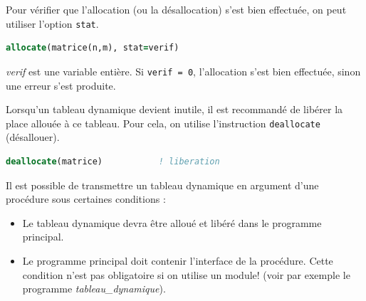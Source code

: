 \documentclass[a4paper,twoside]{article}
\begin{document}
\begin{remarque}
Pour vérifier que l'allocation (ou la désallocation) s'est bien effectuée, on peut utiliser l'option \texttt{stat}. 
\begin{lstlisting}[language=Fortran]
allocate(matrice(n,m), stat=verif)
\end{lstlisting}
\emph{verif} est une variable entière. Si \texttt{verif = 0}, l'allocation s'est bien effectuée, sinon une erreur s'est produite. 
\end{remarque}

Lorsqu'un tableau dynamique devient inutile, il est recommandé de libérer la place allouée à ce tableau. Pour cela, on utilise l'instruction \texttt{deallocate} (désallouer).
\begin{lstlisting}[language=Fortran]
deallocate(matrice)           ! liberation
\end{lstlisting}

\bigskip

Il est possible de transmettre un tableau dynamique en argument d'une procédure sous certaines conditions : 
\begin{itemize}
\item Le tableau dynamique devra être alloué et libéré dans le programme principal. 
\item Le programme principal doit contenir l'interface de la procédure. Cette condition n'est pas obligatoire si on utilise un module! (voir par exemple le programme \emph{tableau\_dynamique}).
\end{itemize}
\end{document}
